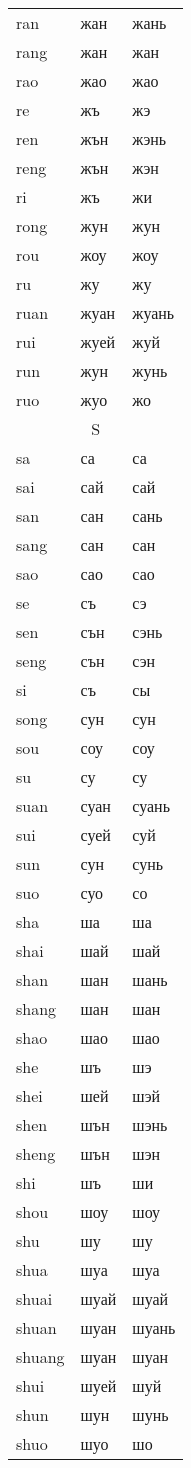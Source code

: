 \begin{longtable}{|l|l|l|}
ran &жан &жань
\\rang &жан &жан
\\rao &жао &жао
\\re &жъ &жэ
\\ren &жън &жэнь
\\reng &жън &жэн
\\ri &жъ &жи
\\rong &жун &жун
\\rou &жоу &жоу
\\ru &жу &жу
\\ruan &жуан &жуань
\\rui &жуей &жуй
\\run &жун &жунь
\\ruo &жуо &жо
\\

\hline

\multicolumn{3}{|c|}{S} \\ \hline

sa &са &са
\\sai &сай &сай
\\san &сан &сань
\\sang &сан &сан
\\sao &сао &сао
\\se &съ &сэ
\\sen &сън &сэнь
\\seng &сън &сэн
\\si &съ &сы
\\song &сун &сун
\\sou &соу &соу
\\su &су &су
\\suan &суан &суань
\\sui &суей &суй
\\sun &сун &сунь
\\suo &суо &со
\\sha &ша &ша
\\shai &шай &шай
\\shan &шан &шань
\\shang &шан &шан
\\shao &шао &шао
\\she &шъ &шэ
\\shei &шей &шэй
\\shen &шън &шэнь
\\sheng &шън &шэн
\\shi &шъ &ши
\\shou &шоу &шоу
\\shu &шу &шу
\\shua &шуа &шуа
\\shuai &шуай &шуай
\\shuan &шуан &шуань
\\shuang &шуан &шуан
\\shui &шуей &шуй
\\shun &шун &шунь
\\shuo &шуо &шо
\\


\end{longtable}
